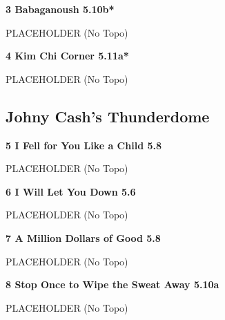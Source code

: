 \begin{multicols}{2}
\needspace{1.5cm}
\label{rt:Babaganoush}
\colorbox{RoyalBlue!20}{
\parbox{0.95\linewidth}{
\textbf{
3 Babaganoush 5.10b*  
}}}
\begin{adjustwidth}{0.5cm}{}			
PLACEHOLDER
  (No Topo)
\end{adjustwidth}




\needspace{1.5cm}
\label{rt:Kim Chi Corner}
\colorbox{RoyalBlue!20}{
\parbox{0.95\linewidth}{
\textbf{
4 Kim Chi Corner 5.11a*  
}}}
\begin{adjustwidth}{0.5cm}{}			
PLACEHOLDER
  (No Topo)
\end{adjustwidth}





\needspace{1.5cm}
\subsection*{Johny Cash's Thunderdome}\label{bf:Johny Cash's Thunderdome}
	


\needspace{1.5cm}
\label{rt:I Fell for You Like a Child}
\colorbox{green!20}{
\parbox{0.95\linewidth}{
\textbf{
5 I Fell for You Like a Child 5.8  
}}}
\begin{adjustwidth}{0.5cm}{}			
PLACEHOLDER
  (No Topo)
\end{adjustwidth}




\needspace{1.5cm}
\label{rt:I Will Let You Down}
\colorbox{green!20}{
\parbox{0.95\linewidth}{
\textbf{
6 I Will Let You Down 5.6  
}}}
\begin{adjustwidth}{0.5cm}{}			
PLACEHOLDER
  (No Topo)
\end{adjustwidth}




\needspace{1.5cm}
\label{rt:A Million Dollars of Good}
\colorbox{green!20}{
\parbox{0.95\linewidth}{
\textbf{
7 A Million Dollars of Good 5.8  
}}}
\begin{adjustwidth}{0.5cm}{}			
PLACEHOLDER
  (No Topo)
\end{adjustwidth}




\needspace{1.5cm}
\label{rt:Stop Once to Wipe the Sweat Away}
\colorbox{RoyalBlue!20}{
\parbox{0.95\linewidth}{
\textbf{
8 Stop Once to Wipe the Sweat Away 5.10a  
}}}
\begin{adjustwidth}{0.5cm}{}			
PLACEHOLDER
  (No Topo)
\end{adjustwidth}






\end{multicols}
\clearpage